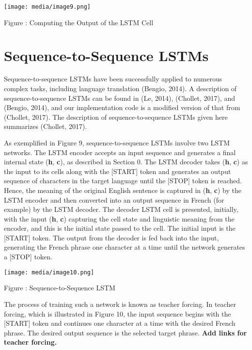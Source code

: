 \documentclass[
]{article}
\begin{document}
\texttt{[image: media/image9.png]}

Figure : Computing the Output of the LSTM Cell

\hypertarget{sequence-to-sequence-lstms}{%
\section{Sequence-to-Sequence LSTMs}\label{sequence-to-sequence-lstms}}

Sequence-to-sequence LSTMs have been successfully applied to numerous
complex tasks, including language translation (Bengio, 2014). A
description of sequence-to-sequence LSTMs can be found in (Le, 2014),
(Chollet, 2017), and (Bengio, 2014), and our implementation code is a
modified version of that from (Chollet, 2017). The description of
sequence-to-sequence LSTMs given here summarizes (Chollet, 2017).

As exemplified in Figure 9, sequence-to-sequence LSTMs involve two LSTM
networks. The LSTM encoder accepts an input sequence and generates a
final internal state (\textbf{h}, \textbf{c}), as described in Section
0. The LSTM decoder takes (\textbf{h}, \textbf{c}) as the input to its
cells along with the {[}START{]} token and generates an output sequence
of characters in the target language until the {[}STOP{]} token is
reached. Hence, the meaning of the original English sentence is captured
in (\textbf{h}, \textbf{c}) by the LSTM encoder and then converted into
an output sequence in French (for example) by the LSTM decoder. The
decoder LSTM cell is presented, initially, with the input (\textbf{h},
\textbf{c}) capturing the cell state and linguistic meaning from the
encoder, and this is the initial state passed to the cell. The initial
input is the {[}START{]} token. The output from the decoder is fed back
into the input, generating the French phrase one character at a time
until the network generates a {[}STOP{]} token.

\texttt{[image: media/image10.png]}

Figure : Sequence-to-Sequence LSTM

The process of training such a network is known as teacher forcing. In
teacher forcing, which is illustrated in Figure 10, the input sequence
begins with the {[}START{]} token and continues one character at a time
with the desired French phrase. The desired output sequence is the
selected target phrase. \textbf{Add links for teacher forcing.}
\end{document}
